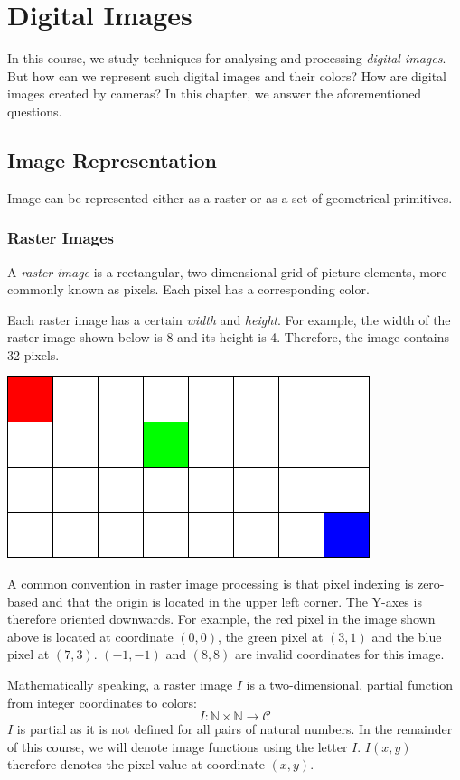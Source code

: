 \documentclass{book}
\begin{document}
\chapter{Digital Images}
In this course, we study techniques for analysing and processing \emph{digital images}. But how can we represent such digital images and their colors? How are digital images created by cameras? In this chapter, we answer the aforementioned questions.

\section{Image Representation}
Image can be represented either as a raster or as a set of geometrical primitives.

\subsection{Raster Images}
A \emph{raster image} is a rectangular, two-dimensional grid of picture elements, more commonly known as pixels. Each pixel has a corresponding color.

Each raster image has a certain \emph{width} and \emph{height}. For example, the width of the raster image shown below is 8 and its height is 4. Therefore, the image contains 32 pixels.
\begin{center}
\includegraphics[scale=0.35]{rasterimage.png}
\end{center}
A common convention in raster image processing is that pixel indexing is zero-based and that the origin is located in the upper left corner. The Y-axes is therefore oriented downwards. For example, the red pixel in the image shown above is located at coordinate $(0, 0)$, the green pixel at $(3, 1)$ and the blue pixel at $(7, 3)$. $(-1, -1)$ and $(8, 8)$ are invalid coordinates for this image.

Mathematically speaking, a raster image $I$ is a two-dimensional, partial function from integer coordinates to colors:
$$I: \mathbb{N} \times \mathbb{N} \rightarrow \mathcal{C}$$
$I$ is partial as it is not defined for all pairs of natural numbers. In the remainder of this course, we will denote image functions using the letter $I$. $I(x, y)$ therefore denotes the pixel value at coordinate $(x, y)$.
\end{document}
